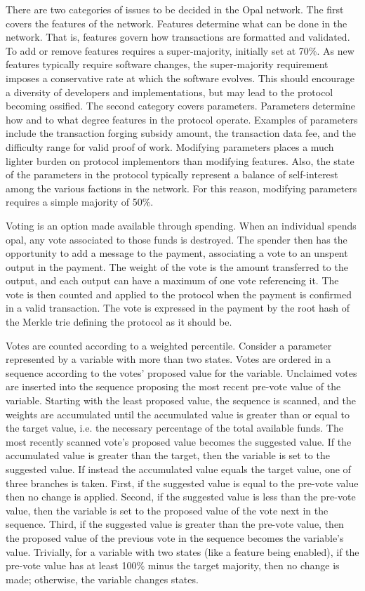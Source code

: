 \documentclass[10pt,twocolumn]{article}
\begin{document}
There are two categories of issues to be decided in the Opal network.  The first covers the features of the network.  Features determine what can be done in the network.  That is, features govern how transactions are formatted and validated.  To add or remove features requires a super-majority, initially set at 70\%.  As new features typically require software changes, the super-majority requirement imposes a conservative rate at which the software evolves.  This should encourage a diversity of developers and implementations, but may lead to the protocol becoming ossified.  The second category covers parameters.  Parameters determine how and to what degree features in the protocol operate.  Examples of parameters include the transaction forging subsidy amount, the transaction data fee, and the difficulty range for valid proof of work.  Modifying parameters places a much lighter burden on protocol implementors than modifying features.  Also, the state of the parameters in the protocol typically represent a balance of self-interest among the various factions in the network.  For this reason, modifying parameters requires a simple majority of 50\%.

Voting is an option made available through spending.  When an individual spends opal, any vote associated to those funds is destroyed.  The spender then has the opportunity to add a message to the payment, associating a vote to an unspent output in the payment.  The weight of the vote is the amount transferred to the output, and each output can have a maximum of one vote referencing it.  The vote is then counted and applied to the protocol when the payment is confirmed in a valid transaction.  The vote is expressed in the payment by the root hash of the Merkle trie defining the protocol as it should be.

Votes are counted according to a weighted percentile.  Consider a parameter represented by a variable with more than two states.  Votes are ordered in a sequence according to the votes' proposed value for the variable.  Unclaimed votes are inserted into the sequence proposing the most recent pre-vote value of the variable.  Starting with the least proposed value, the sequence is scanned, and the weights are accumulated until the accumulated value is greater than or equal to the target value, i.e. the necessary percentage of the total available funds.  The most recently scanned vote's proposed value becomes the suggested value.  If the accumulated value is greater than the target, then the variable is set to the suggested value.  If instead the accumulated value equals the target value, one of three branches is taken.  First, if the suggested value is equal to the pre-vote value then no change is applied.  Second, if the suggested value is less than the pre-vote value, then the variable is set to the proposed value of the vote next in the sequence.  Third, if the suggested value is greater than the pre-vote value, then the proposed value of the previous vote in the sequence becomes the variable's value.  Trivially, for a variable with two states (like a feature being enabled), if the pre-vote value has at least 100\% minus the target majority, then no change is made; otherwise, the variable changes states.
\end{document}
